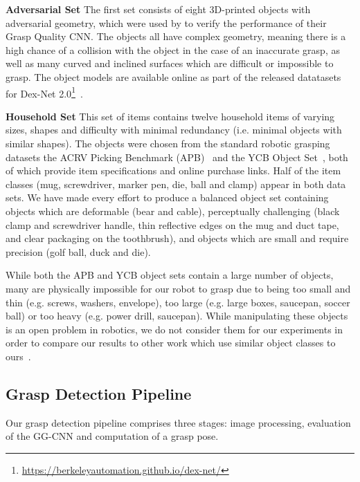 \documentclass[conference]{IEEEtran}
\begin{document}
\textbf{Adversarial Set} The first set consists of eight 3D-printed objects with adversarial geometry, which were used by \citet{Mahler2017Dex2} to verify the performance of their Grasp Quality CNN.  The objects all have complex geometry, meaning there is a high chance of a collision with the object in the case of an inaccurate grasp, as well as many curved and inclined surfaces which are difficult or impossible to grasp.  The object models are available online as part of the released datatasets for Dex-Net 2.0\footnote{\href{https://berkeleyautomation.github.io/dex-net/}{https://berkeleyautomation.github.io/dex-net/}}~\cite{Mahler2017Dex2}.

\textbf{Household Set} This set of items contains twelve household items of varying sizes, shapes and difficulty with minimal redundancy (i.e. minimal objects with similar shapes).  The objects were chosen from the standard robotic grasping datasets the ACRV Picking Benchmark (APB)~\cite{leitner2017acrvpicking} and the YCB Object Set~\cite{calli2017ycb}, both of which provide item specifications and online purchase links.  Half of the item classes (mug, screwdriver, marker pen, die, ball and clamp) appear in both data sets.  We have made every effort to produce a balanced object set containing objects which are deformable (bear and cable), perceptually challenging (black clamp and screwdriver handle, thin reflective edges on the mug and duct tape, and clear packaging on the toothbrush), and objects which are small and require precision (golf ball, duck and die). 

While both the APB and YCB object sets contain a large number of objects, many are physically impossible for our robot to grasp due to being too small and thin (e.g. screws, washers, envelope), too large (e.g. large boxes, saucepan, soccer ball) or too heavy (e.g. power drill, saucepan).
While manipulating these objects is an open problem in robotics, we do not consider them for our experiments in order to compare our results to other work which use similar object classes to ours~\cite{Johns2016DeepUncertainty, Lenz2015DeepGrasps,Levine2017LearningCollection, Mahler2017Dex2, Pinto2016SupersizingHours}.


\subsection{Grasp Detection Pipeline}
\label{sec:pipeline}

Our grasp detection pipeline comprises three stages: image processing, evaluation of the GG-CNN and computation of a grasp pose.
\end{document}
